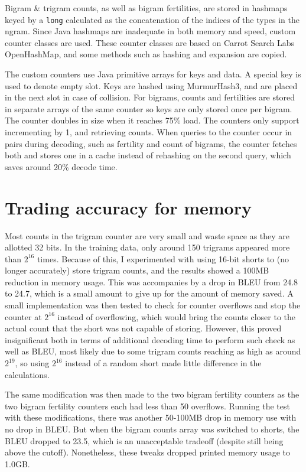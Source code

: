 \documentclass[11pt]{article}
\begin{document}
Bigram \& trigram counts, as well as bigram fertilities, are stored in hashmaps keyed by a \texttt{long} calculated as the concatenation of the indices of the types in the ngram. Since Java hashmaps are inadequate in both memory and speed, custom counter classes are used. These counter classes are based on Carrot Search Labs OpenHashMap, and some methods such as hashing and expansion are copied.

The custom counters use Java primitive arrays for keys and data. A special key is used to denote empty slot. Keys are hashed using MurmurHash3, and are placed in the next slot in case of collision. For bigrams, counts and fertilities are stored in separate arrays of the same counter so keys are only stored once per bigram. The counter doubles in size when it reaches 75\% load. The counters only support incrementing by 1, and retrieving counts. When queries to the counter occur in pairs during decoding, such as fertility and count of bigrams, the counter fetches both and stores one in a cache instead of rehashing on the second query, which saves around 20\% decode time.

\section{Trading accuracy for memory}

Most counts in the trigram counter are very small and waste space as they are allotted 32 bits. In the training data, only around 150 trigrams appeared more than $2^{16}$ times. Because of this, I experimented with using 16-bit shorts to (no longer accurately) store trigram counts, and the results showed a 100MB reduction in memory usage. This was accompanies by a drop in BLEU from 24.8 to 24.7, which is a small amount to give up for the amount of memory saved. A small implementation was then tested to check for counter overflows and stop the counter at $2^{16}$ instead of overflowing, which would bring the counts closer to the actual count that the short was not capable of storing. However, this proved insignificant both in terms of additional decoding time to perform such check as well as BLEU, most likely due to some trigram counts reaching as high as around $2^{19}$, so using $2^{16}$ instead of a random short made little difference in the calculations.

The same modification was then made to the two bigram fertility counters as the two bigram fertility counters each had less than 50 overflows. Running the test with these modifications, there was another 50-100MB drop in memory use with no drop in BLEU. But when the bigram counts array was switched to shorts, the BLEU dropped to 23.5, which is an unacceptable tradeoff (despite still being above the cutoff). Nonetheless, these tweaks dropped printed memory usage to 1.0GB. 
\end{document}
